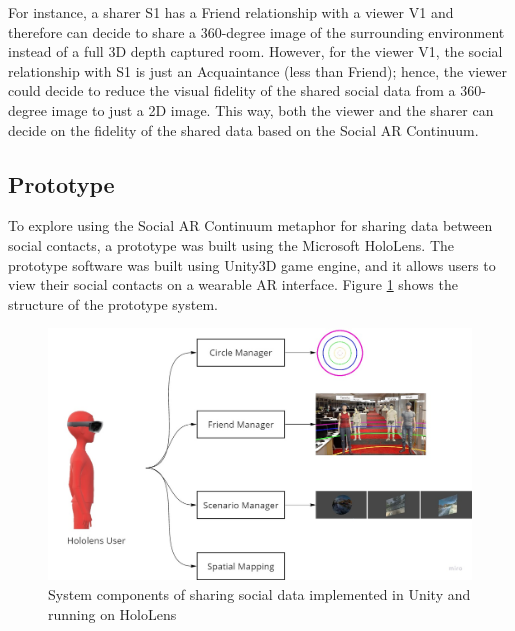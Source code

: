 
For instance, a sharer S1 has a Friend relationship with a viewer V1 and therefore can decide to share a 360-degree image of the surrounding environment instead of a full 3D depth captured room. However, for the viewer V1, the social relationship with S1 is just an Acquaintance (less than Friend); hence, the viewer could decide to reduce the visual fidelity of the shared social data from a 360-degree image to just a 2D image. This way, both the viewer and the sharer can decide on the fidelity of the shared data based on the Social AR Continuum.  


\subsection{Prototype}

To explore using the Social AR Continuum metaphor for sharing data between social contacts, a prototype was built using the Microsoft HoloLens. The prototype software was built using Unity3D game engine, and it allows users to view their social contacts on a wearable AR interface. Figure \ref{fig:data:system} shows the structure of the prototype system. 

\begin{figure}[ht]
    \centering
    \includegraphics[width=\linewidth]{images/52-data-chi/chi18-system.jpg}
    \caption{System components of sharing social data implemented in Unity and running on HoloLens}
    \label{fig:data:system}
\end{figure}

